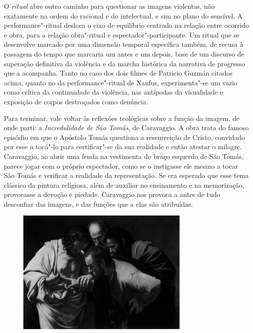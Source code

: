 O \emph{ritual} abre outro caminho para questionar as imagens violentas,
não exatamente na ordem do racional e do intelectual, e sim no plano do
sensível. A performance"-ritual desloca o eixo de equilíbrio centrado na
relação entre ocorrido e obra, para a relação obra"-ritual e
espectador"-participante. Um ritual que se desenvolve marcado por uma
dimensão temporal específica também, de recusa à passagem do tempo que
marcaria um antes e um depois, base de um discurso de superação definitiva da
violência e da marcha histórica da narrativa de progresso que a
acompanha. Tanto no caso dos dois filmes de Patricio Guzmán citados
acima, quanto no da performance"-ritual de Naufus, experimenta"-se um vazio
como crítica da continuidade da violência, nas antípodas da visualidade
e exposição de corpos destroçados como denúncia.

\asterisc

Para terminar, vale voltar às reflexões teológicas sobre a função da
imagem, de onde parti: a \emph{Incredulidade de São Tomás}, de
Caravaggio. A obra trata do famoso episódio em que o Apóstolo Tomás
questiona a ressurreição de Cristo, convidado por esse a tocá"-lo para
certificar"-se da sua realidade e então atestar o milagre. Caravaggio,
ao abrir uma fenda na vestimenta do braço esquerdo de São Tomás, parece
jogar com o próprio espectador, como se o instigasse ele mesmo a tocar São
Tomás e verificar a realidade da representação. Se era esperado que esse
tema clássico da pintura religiosa, além de auxiliar no ensinamento e na
memorização, provocasse a devoção e piedade, Caravaggio nos provoca a
antes de tudo desconfiar das imagens, e das funções que a elas são
atribuídas.

\begin{figure}[!ht]
\centering
 \includegraphics[width=85mm]{./imgs/crer.png}
\caption{\tiny{}}
\end{figure}

